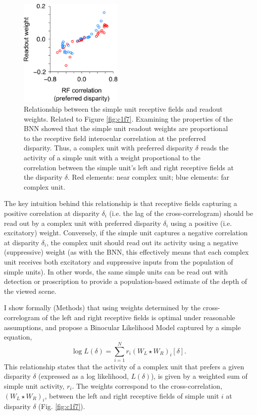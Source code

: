 \begin{figure}[!h]
  \centering
  \includegraphics[width=5cm,keepaspectratio]{FigS6.png}
  \caption[Relationship between receptive field properties and readout weights.]{Relationship between the simple unit receptive fields and readout weights. Related to Figure \ref{fig:c1f7}. Examining the properties of the BNN showed that the simple unit readout weights are proportional to the receptive field interocular correlation at the preferred disparity. Thus, a complex unit with preferred disparity $\delta$ reads the activity of a simple unit with a weight proportional to the correlation between the simple unit's left and right receptive fields at the disparity $\delta$. Red elements: near complex unit; blue elements: far complex unit.}
  \label{fig:c1fs6}
\end{figure}

The key intuition behind this relationship is that receptive fields capturing a positive correlation at disparity $\delta_{i}$ (i.e. the lag of the cross-correlogram) should be read out by a complex unit with preferred disparity $\delta_{i}$ using a positive (i.e. excitatory) weight. Conversely, if the simple unit captures a negative correlation at disparity $\delta_{i}$, the complex unit should read out its activity using a negative (suppressive) weight (as with the BNN, this effectively means that each complex unit receives both excitatory and suppressive inputs from the population of simple units). In other words, the same simple units can be read out with detection or proscription to provide a population-based estimate of the depth of the viewed scene.

I show formally (Methods) that using weights determined by the cross-correlogram of the left and right receptive fields is optimal under reasonable assumptions, and propose a Binocular Likelihood Model captured by a simple equation,
\[
\log L(\delta) = \sum_{i=1}^N r_i (W_L \star W_R)_i [\delta].
\]
This relationship states that the activity of a complex unit that prefers a given disparity $\delta$ (expressed as a log likelihood, $L(\delta)$), is given by a weighted sum of simple unit activity, $r_i$. The weights correspond to the cross-correlation, $(W_L \star W_R)_i$, between the left and right receptive fields of simple unit $i$ at disparity $\delta$ (Fig. \ref{fig:c1f7}).

